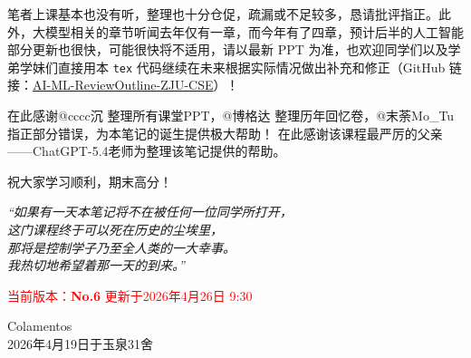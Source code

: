 \documentclass[a4paper,11pt]{article}
\begin{document}
笔者上课基本也没有听，整理也十分仓促，疏漏或不足较多，恳请批评指正。此外，大模型相关的章节听闻去年仅有一章，而今年有了四章，预计后半的人工智能部分更新也很快，可能很快将不适用，请以最新 PPT 为准，也欢迎同学们以及学弟学妹们直接用本 \texttt{tex} 代码继续在未来根据实际情况做出补充和修正（GitHub 链接：\href{https://github.com/Colamentos2023/AI-ML-ReviewOutline-ZJU-CSE}{AI-ML-ReviewOutline-ZJU-CSE}）！

在此感谢@cccc沉 整理所有课堂PPT，@博格达 整理历年回忆卷，@末荼Mo\_Tu 指正部分错误，为本笔记的诞生提供极大帮助！
在此感谢该课程最严厉的父亲——ChatGPT-5.4老师为整理该笔记提供的帮助。

祝大家学习顺利，期末高分！
\begin{center}
\vspace{1.2em}
\begin{minipage}{0.82\textwidth}
\centering
\itshape
\normalsize
{}
“如果有一天本笔记将不在被任何一位同学所打开，\\
这门课程终于可以死在历史的尘埃里，\\
那将是控制学子乃至全人类的一大幸事。\\
我热切地希望着那一天的到来。”
\end{minipage}
\vspace{1.2em}
\end{center}

\textcolor{red}{当前版本：\textbf{No.6} 更新于2026年4月26日 9:30}

\begin{flushright}
Colamentos\\
2026年4月19日于玉泉31舍
\end{flushright}
\newpage
\tableofcontents
\thispagestyle{empty}
\newpage


















\end{document}
